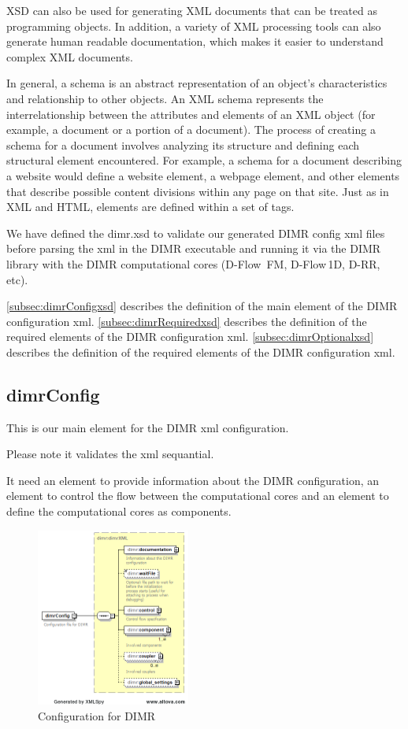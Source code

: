 \documentclass[signature]{deltares_manual}
\newcommand{\dflowfm}{\textrm{D-Flow~FM}\xspace}
\newcommand{\dflowoned}{D-Flow\,1D\xspace}
\newcommand{\drr}{D-RR\xspace}
\newcommand{\dimr}{\textrm{DIMR}\xspace}
\begin{document}
XSD can also be used for generating XML documents that can be treated as programming objects. In addition, a variety of XML processing tools can also generate human readable documentation, which makes it easier to understand complex XML documents.

In general, a schema is an abstract representation of an object's characteristics and relationship to other objects. An XML schema represents the interrelationship between the attributes and elements of an XML object (for example, a document or a portion of a document). The process of creating a schema for a document involves analyzing its structure and defining each structural element encountered. For example, a schema for a document describing a website would define a website element, a webpage element, and other elements that describe possible content divisions within any page on that site. Just as in XML and HTML, elements are defined within a set of tags.

We have defined the dimr.xsd to validate our generated \dimr config xml files before parsing the xml in the \dimr executable and running it via the \dimr library with the \dimr computational cores (\dflowfm, \dflowoned, \drr, etc).

\autoref{subsec:dimrConfigxsd} describes the definition of the  main element of the \dimr configuration xml. 
\autoref{subsec:dimrRequiredxsd} describes the definition of the  required elements of the \dimr configuration xml. 
\autoref{subsec:dimrOptionalxsd} describes the definition of the  required elements of the \dimr configuration xml.
\subsection{dimrConfig}
\label{subsec:dimrConfigxsd}
This is our main element for the \dimr xml configuration.

\Note Please note it validates the xml sequantial.

It need an element to provide information about the \dimr configuration, an element to control the flow between the computational cores and an element to define the computational cores as components.

\begin{figure}[H]
	\centering
	\includegraphics[width=0.45\textwidth] {pictures/dimr_diagrams/dimr_p1.png}
	\caption{Configuration for DIMR} 
	\label{fig:dimrConfig}
\end{figure}
\end{document}
